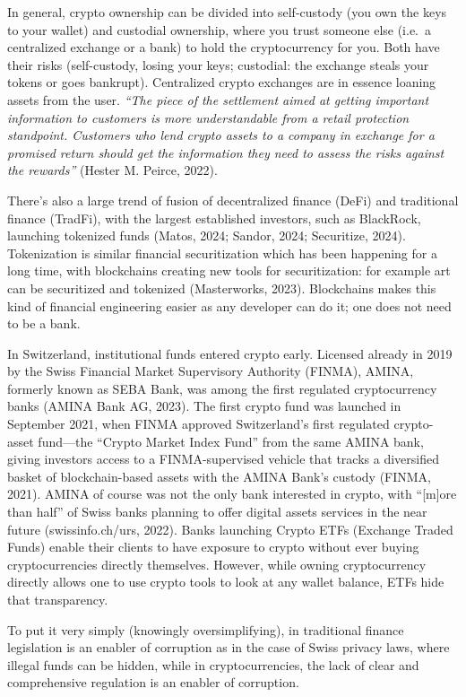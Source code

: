 \documentclass[
  12pt,
  letterpaper,
  DIV=11,
  numbers=noendperiod]{scrartcl}
\begin{document}
In general, crypto ownership can be divided into self-custody (you own
the keys to your wallet) and custodial ownership, where you trust
someone else (i.e.~a centralized exchange or a bank) to hold the
cryptocurrency for you. Both have their risks (self-custody, losing your
keys; custodial: the exchange steals your tokens or goes bankrupt).
Centralized crypto exchanges are in essence loaning assets from the
user. \emph{``The piece of the settlement aimed at getting important
information to customers is more understandable from a retail protection
standpoint. Customers who lend crypto assets to a company in exchange
for a promised return should get the information they need to assess the
risks against the rewards''} (Hester M. Peirce, 2022).

There's also a large trend of fusion of decentralized finance (DeFi) and
traditional finance (TradFi), with the largest established investors,
such as BlackRock, launching tokenized funds (Matos, 2024; Sandor, 2024;
Securitize, 2024). Tokenization is similar financial securitization
which has been happening for a long time, with blockchains creating new
tools for securitization: for example art can be securitized and
tokenized (Masterworks, 2023). Blockchains makes this kind of financial
engineering easier as any developer can do it; one does not need to be a
bank.

In Switzerland, institutional funds entered crypto early. Licensed
already in 2019 by the Swiss Financial Market Supervisory Authority
(FINMA), AMINA, formerly known as SEBA Bank, was among the first
regulated cryptocurrency banks (AMINA Bank AG, 2023). The first crypto
fund was launched in September 2021, when FINMA approved Switzerland's
first regulated crypto-asset fund---the ``Crypto Market Index Fund''
from the same AMINA bank, giving investors access to a FINMA-supervised
vehicle that tracks a diversified basket of blockchain-based assets with
the AMINA Bank's custody (FINMA, 2021). AMINA of course was not the only
bank interested in crypto, with ``{[}m{]}ore than half'' of Swiss banks
planning to offer digital assets services in the near future
(swissinfo.ch/urs, 2022). Banks launching Crypto ETFs (Exchange Traded
Funds) enable their clients to have exposure to crypto without ever
buying cryptocurrencies directly themselves. However, while owning
cryptocurrency directly allows one to use crypto tools to look at any
wallet balance, ETFs hide that transparency.

To put it very simply (knowingly oversimplifying), in traditional
finance legislation is an enabler of corruption as in the case of Swiss
privacy laws, where illegal funds can be hidden, while in
cryptocurrencies, the lack of clear and comprehensive regulation is an
enabler of corruption.
\end{document}

